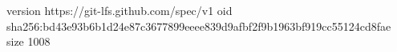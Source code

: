 version https://git-lfs.github.com/spec/v1
oid sha256:bd43e93b6b1d24e87c3677899eeee839d9afbf2f9b1963bf919cc55124cd8fae
size 1008
